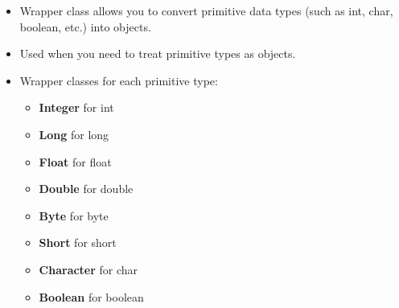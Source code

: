 \setlength{\columnsep}{3pt}
\begin{flushleft}
	
	\begin{itemize}
		\item Wrapper class allows you to convert primitive data types (such as int, char, boolean, etc.) into objects. 
		\item Used when you need to treat primitive types as objects.
		\item Wrapper classes for each primitive type:
		\begin{itemize}
			\item \textbf{Integer} for int
			\item \textbf{Long} for long
			\item \textbf{Float} for float
			\item \textbf{Double} for double
			\item \textbf{Byte} for byte
			\item \textbf{Short} for short
			\item \textbf{Character} for char
			\item \textbf{Boolean} for boolean
		\end{itemize}		
	\end{itemize}
	
\end{flushleft}

\newpage